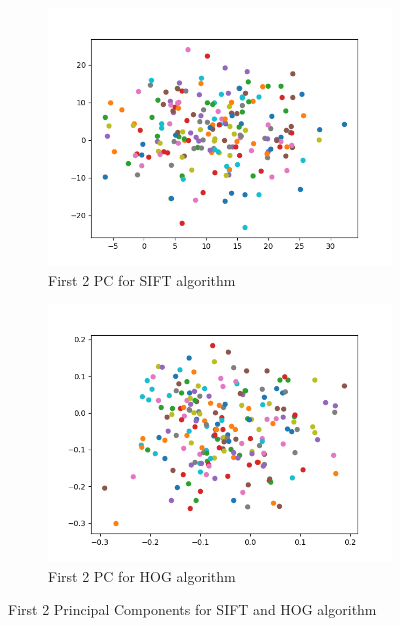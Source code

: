 \begin{figure}[H]
\begin{subfigure}{.5\textwidth}
  \centering
  \includegraphics[width=.8\linewidth]{PCA_sift_2d.png}
  \caption{First 2 PC for SIFT algorithm}
  \label{fig:PCA_sift_2d}
\end{subfigure}%
\begin{subfigure}{.5\textwidth}
  \centering
  \includegraphics[width=.8\linewidth]{PCA_HOG_2d.png}
  \caption{First 2 PC for HOG algorithm}
  \label{fig:PCA_hog_2d}
\end{subfigure}
\caption{First 2 Principal Components for SIFT and HOG algorithm}
\label{fig:PCA_2d}


\end{figure}
